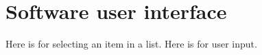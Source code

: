 
\section{Software user interface}\label{sec:userinterface}
Here is for \textcolor{SelectItem}{selecting an item} in a list. Here is for \textcolor{UserInput}{user input}.


